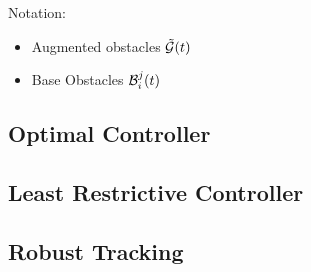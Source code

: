Notation:
\begin{itemize}
\item Augmented obstacles $\tilde{\mathcal{G}}(t)$
\item Base Obstacles $\mathcal{B}_i^j(t)$
\end{itemize}

\subsection{Optimal Controller} \label{sec:incomp_optctrl}
\subsection{Least Restrictive Controller}  \label{sec:incomp_LRctrl}
\subsection{Robust Tracking} \label{sec:incomp_robust}